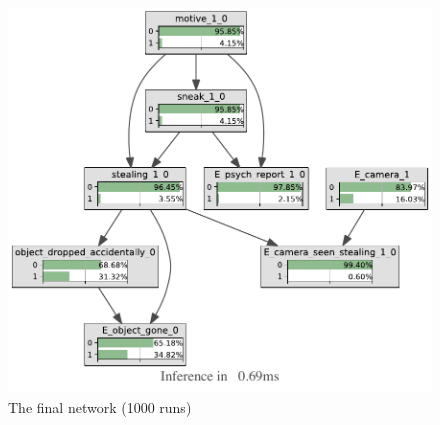 \documentclass[12pt]{article}
\begin{document}
\begin{figure}[htbp]
\begin{center}
\includegraphics[width=\linewidth]{GroteMarktPrivateEND/bnImage/BNIMAGEGroteMarktPrivate.pdf}
\caption{The final network (1000 runs)}
\label{bullet}
\end{center}
\end{figure}
\end{document}
